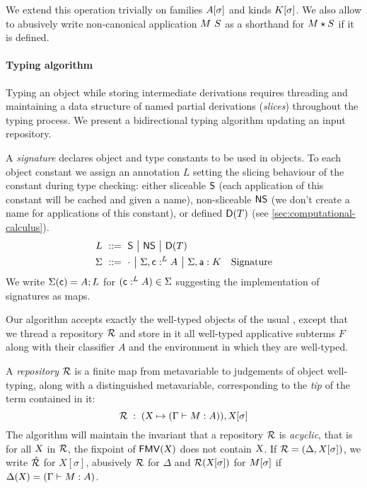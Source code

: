 \documentclass[9pt]{sigplanconf}
\begin{document}
We extend this operation trivially on families ${A}[{\sigma}]$ and
kinds ${K}[{\sigma}]$. We also allow to abusively write
non-canonical application ${M}\  S$ as a shorthand for ${M}\star{S}$
if it is defined.


\paragraph{Typing algorithm}

Typing an object while storing intermediate derivations requires
threading and maintaining a data structure of named partial
derivations (\emph{slices}) throughout the typing process. We present
a bidirectional typing algorithm updating an input repository.

A \emph{signature} declares object and type constants to be used in
objects. To each object constant we assign an annotation $L$ setting
the slicing behaviour of the constant during type checking: either
sliceable $\mathsf{S}$ (each application of this constant will be
cached and given a name), non-sliceable $\mathsf{NS}$ (we don't
create a name for applications of this constant), or defined
$\mathsf{D}({T})$ (see \ref{sec:computational-calculus}).
\begin{align*}
  L &\ ::=\ 
  \mathsf{S} \ {\big|}\ 
  \mathsf{NS} \ {\big|}\ 
  \mathsf{D}({T})
  \\
  \Sigma &\ ::=\ 
  \cdot \ {\big|}\ 
  {\Sigma},{\text{\textsf{c}} :^L A} \ {\big|}\ 
  {\Sigma},{\text{\textsf{a}} : K}
  &\text{Signature}
\end{align*}
We write $\Sigma(\text{\textsf{c}}) = A; L$ for $(\text{\textsf{c}} :^L A) \in \Sigma$
suggesting the implementation of signatures as maps.

Our algorithm accepts exactly the well-typed objects of the usual \LF,
except that we thread a repository $\mathcal{R}$ and store in it all
well-typed applicative subterms $F$ along with their classifier $A$
and the environment in which they are well-typed.


A \emph{repository} $\mathcal{R}$ is a finite map from metavariable to
judgements of object well-typing, along with a distinguished
metavariable, corresponding to the \emph{tip} of the term contained in
it:
$$ \mathcal{R}\;:\;(\text{\textsl{X}} \mapsto (\Gamma\vdash{M}:{A})), {\text{\textsl{X}}}[{\sigma}] $$
The algorithm will maintain the invariant that a repository
$\mathcal{R}$ is \emph{acyclic}, that is for all $\text{\textsl{X}}$ in $\mathcal{R}$, the
fixpoint of ${\text{\textsf{FMV}}}({\text{\textsl{X}}})$ does not contain $\text{\textsl{X}}$. If $\mathcal{R} =
(\Delta, X[\sigma])$, we write $\hat {\mathcal{R}}$ for $X[\sigma]$, abusively
$\mathcal{R}$ for $\Delta$ and $\mathcal{R} ({\text{\textsl{X}}}[{\sigma}])$ for ${M}[{\sigma}]$
if $\Delta(\text{\textsl{X}}) = (\Gamma\vdash M : A)$.
\end{document}

